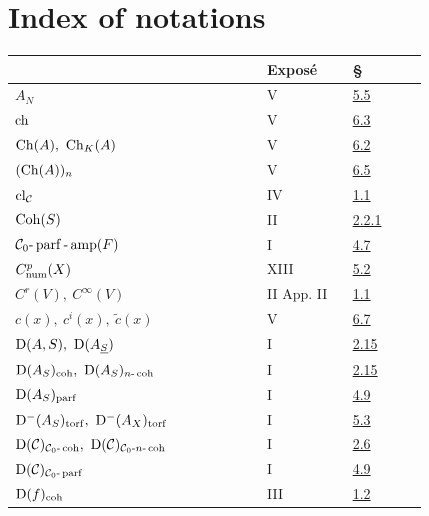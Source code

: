 \newpage
{}\section*{Index of notations}
\begingroup\small
\begin{longtable}{@{}>{\raggedright\arraybackslash}p{0.50\linewidth}>{\raggedright\arraybackslash}p{0.17\linewidth}>{\raggedright\arraybackslash}p{0.15\linewidth}@{}}
\toprule
 & Exposé & §\\
\midrule
\endhead
\(A_N\) & V & \hyperlink{sga6.e05.para.5-5}{5.5}\\
\(\operatorname{ch}\) & V & \hyperlink{sga6.e05.para.6-3}{6.3}\\
\(\Ch(A),\ \Ch_K(A)\) & V & \hyperlink{sga6.e05.def.6-2}{6.2}\\
\((\operatorname{Ch}(A))_n\) & V & \hyperlink{sga6.e05.prop.6-5}{6.5}\\
\(\operatorname{cl}_{\mathcal C}\) & IV & \hyperlink{sga6.e04.para.1-1}{1.1}\\
\(\operatorname{Coh}(S)\) & II & \hyperlink{sga6.e02.notation.2-2-1}{2.2.1}\\
\(\mathcal C_0\text{-}\operatorname{parf}\text{-}\operatorname{amp}(F)\) & I & \hyperlink{sga6.e01.def.4-7}{4.7}\\
\(C^p_{\operatorname{num}}(X)\) & XIII & \hyperlink{sga6.e13.prop.5-2}{5.2}\\
\(C^r(V),\ C^\infty(V)\) & II App. II & \hyperlink{sga6.e02.sec.1.1}{1.1}\\
\(c(x),\ c^i(x),\ \widetilde c(x)\) & V & \hyperlink{sga6.e05.para.6-7}{6.7}\\
\(\Dcat(A,S),\ \Dcat(A_{\underline S})\) & I & \hyperlink{sga6.e01.ex.2-15}{2.15}\\
\(\Dcat(A_S)_{\coh},\ \Dcat(A_S)_{n\text{-}\coh}\) & I & \hyperlink{sga6.e01.ex.2-15}{2.15}\\
\(\mathrm D(A_S)_{\operatorname{parf}}\) & I & \hyperlink{sga6.e01.notation.4-9}{4.9}\\
\(\Dcat^{-}(A_S)_{\torf},\ \Dcat^{-}(A_X)_{\torf}\) & I & \hyperlink{sga6.e01.para.5-3}{5.3}\\
\(\mathrm D(\mathcal C)_{\mathcal C_0\text{-}\operatorname{coh}},\ \mathrm D(\mathcal C)_{\mathcal C_0\text{-}n\text{-}\operatorname{coh}}\) & I & \hyperlink{sga6.e01.schol.2-6}{2.6}\\
\(\mathrm D(\mathcal C)_{\mathcal C_0\text{-}\operatorname{parf}}\) & I & \hyperlink{sga6.e01.notation.4-9}{4.9}\\
\(\mathrm D(f)_{\operatorname{coh}}\) & III & \hyperlink{sga6.e03.def.1-2}{1.2}\\

\end{longtable}
